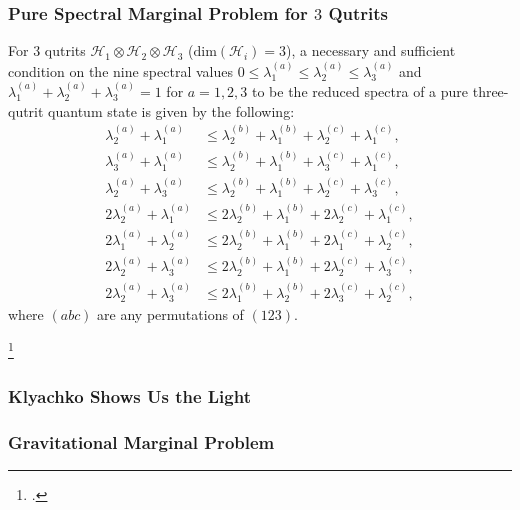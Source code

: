 \documentclass[
    9pt,
    hyperref={bookmarks=false, colorlinks=false}, %
    xcolor={dvipsnames},
]{beamer}
\begin{document}
\begin{frame}
    \frametitle{Pure Spectral Marginal Problem for $3$ Qutrits}
    \begin{theorem}
        For $3$ qutrits $\mathcal H_1 \otimes \mathcal H_2 \otimes \mathcal H_3$  ($\mathrm{dim}(\mathcal H_i) = 3$), a necessary and sufficient condition on the nine spectral values $0 \leq \lambda_1^{(a)} \leq \lambda_2^{(a)} \leq \lambda_3^{(a)}$ and $\lambda_1^{(a)} + \lambda_2^{(a)} + \lambda_3^{(a)} = 1$ for $a = 1,2,3$ to be the reduced spectra of a pure three-qutrit quantum state is given by the following:
        \begin{align*}
            \lambda_2^{(a)} + \lambda_1^{(a)} &\leq \lambda_2^{(b)} + \lambda_1^{(b)} + \lambda_2^{(c)} + \lambda_1^{(c)}, \\
            \lambda_3^{(a)} + \lambda_1^{(a)} &\leq \lambda_2^{(b)} + \lambda_1^{(b)} + \lambda_3^{(c)} + \lambda_1^{(c)}, \\
            \lambda_2^{(a)} + \lambda_3^{(a)} &\leq \lambda_2^{(b)} + \lambda_1^{(b)} + \lambda_2^{(c)} + \lambda_3^{(c)}, \\
            2\lambda_2^{(a)} + \lambda_1^{(a)} &\leq 2\lambda_2^{(b)} + \lambda_1^{(b)} + 2\lambda_2^{(c)} + \lambda_1^{(c)}, \\
            2\lambda_1^{(a)} + \lambda_2^{(a)} &\leq 2\lambda_2^{(b)} + \lambda_1^{(b)} + 2\lambda_1^{(c)} + \lambda_2^{(c)}, \\
            2\lambda_2^{(a)} + \lambda_3^{(a)} &\leq 2\lambda_2^{(b)} + \lambda_1^{(b)} + 2\lambda_2^{(c)} + \lambda_3^{(c)}, \\
            2\lambda_2^{(a)} + \lambda_3^{(a)} &\leq 2\lambda_1^{(b)} + \lambda_2^{(b)} + 2\lambda_3^{(c)} + \lambda_2^{(c)},
        \end{align*}
        where $(abc)$ are any permutations of $(123)$.
    \end{theorem}
    \footcitetext{higuchi2003qutrit}
\end{frame}

\begin{frame}
    \frametitle{Klyachko Shows Us the Light}
\end{frame}

\begin{frame}
    \frametitle{Gravitational Marginal Problem}
\end{frame}
\end{document}

